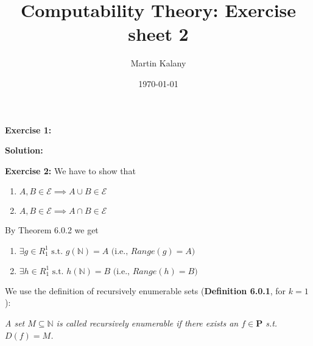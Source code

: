 \documentclass [11pt]{article}
\title{Computability Theory: Exercise sheet 2}
\author{Martin Kalany}
\date{\today}
\newcommand{\E}{\ensuremath{\mathcal{E}}}
\newcommand{\N}{\ensuremath{\mathbb{N}}}
\begin{document}
\maketitle

\bigskip
\noindent
\textbf{Exercise 1:}

\noindent
\textbf{Solution:}

\bigskip
\noindent
\textbf{Exercise 2:} 
We have to show that
\begin{enumerate}[label={\alph*)}] 
 \item $A, B \in \E \implies A\cup B \in \E$ 
 \item $A, B \in \E \implies A\cap B \in \E$ 
\end{enumerate}
By Theorem 6.0.2 we get 
\begin{enumerate}[label={\alph*)}] 
 \item $\exists g \in R_1^1 \text{ s.t.\ } g(\N) = A \text{ (i.e., } Range(g) = A)$
 \item $\exists h \in R_1^1 \text{ s.t.\ } h(\N) = B\text{ (i.e., } Range(h) = B)$
\end{enumerate}
We use the definition of recursively enumerable sets (\textbf{Definition 6.0.1}, for $k=1$):

\noindent
\emph{A set $M \subseteq \N$ is called recursively enumerable if there exists an $f \in \textbf{P}$ s.t.\ $D(f) = M$.}
\end{document}
